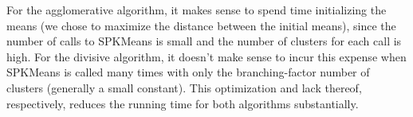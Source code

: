 \documentclass[../tech_report_1.tex]{subfiles}
\begin{document}
For the agglomerative algorithm, it makes sense to spend time initializing the means (we chose to maximize the distance between the initial means), since the number of calls to SPKMeans is small and the number of clusters for each call is high. For the divisive algorithm, it doesn't make sense to incur this expense when SPKMeans is called many times with only the branching-factor number of clusters (generally a small constant). This optimization and lack thereof, respectively, reduces the running time for both algorithms substantially.
\end{document}

